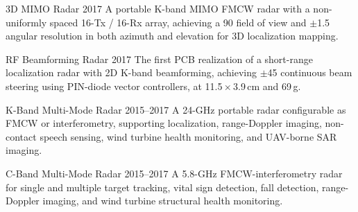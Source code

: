 \begin{cventries}

    \cventry
        {3D MIMO Radar}
        {}
        {}
        {2017}
        {{\cvdescfont A portable K-band MIMO FMCW radar with a non-uniformly spaced 16-Tx / 16-Rx array, achieving a 90\textdegree{} field of view and $\pm$1.5\textdegree{} angular resolution in both azimuth and elevation for 3D localization mapping.}}

    \cventry
        {RF Beamforming Radar}
        {}
        {}
        {2017}
        {{\cvdescfont The first PCB realization of a short-range localization radar with 2D K-band beamforming, achieving $\pm$45\textdegree{} continuous beam steering using PIN-diode vector controllers, at 11.5\,$\times$\,3.9\,cm and 69\,g.}}

    \cventry
        {K-Band Multi-Mode Radar}
        {}
        {}
        {2015--2017}
        {{\cvdescfont A 24-GHz portable radar configurable as FMCW or interferometry, supporting localization, range-Doppler imaging, non-contact speech sensing, wind turbine health monitoring, and UAV-borne SAR imaging.}}

    \cventry
        {C-Band Multi-Mode Radar}
        {}
        {}
        {2015--2017}
        {{\cvdescfont A 5.8-GHz FMCW-interferometry radar for single and multiple target tracking, vital sign detection, fall detection, range-Doppler imaging, and wind turbine structural health monitoring.}}

\end{cventries}



